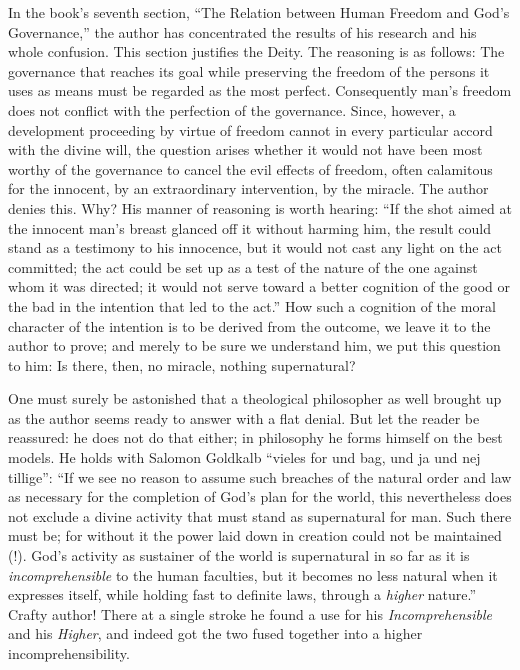 \documentclass[12pt,a4paper,openany]{book}
\newcommand{\opage}[1]{\marginnote{\footnotesize\textit{[#1]}}}
\begin{document}
In the book's seventh section, ``The Relation between Human Freedom and
God's Governance,'' the author has concentrated the results of his research
and his whole confusion. This section justifies the Deity. The reasoning is
as follows: The governance that reaches its goal while preserving the
freedom of the persons it uses as means must be regarded as the most
perfect. Consequently man's freedom does not conflict with the perfection
of the governance. Since, however, a development proceeding by virtue of
freedom cannot in every particular accord with the divine will, the
question arises whether it would not have been most worthy of the
governance to cancel the evil effects of freedom, often calamitous for the
innocent, by an extraordinary intervention, by the miracle. The author
denies this. Why?
\opage{25}His manner of reasoning is worth hearing: ``If the shot aimed at
the innocent man's breast glanced off it without harming him, the result
could stand as a testimony to his innocence, but it would not cast any
light on the act committed; the act could be set up as a test of the nature
of the one against whom it was directed; it would not serve toward a better
cognition of the good or the bad in the intention that led to the act.''
How such a cognition of the moral character of the intention is to be
derived from the outcome, we leave it to the author to prove; and merely to
be sure we understand him, we put this question to him: Is there,
then, no miracle, nothing supernatural?

One must surely be astonished that a theological philosopher as well
brought up as the author seems ready to answer with a flat denial. But let
the reader be reassured: he does not do that either; in philosophy he forms
himself on the best models. He holds with Salomon Goldkalb ``vieles for und
bag, und ja und nej tillige'': ``If we see no reason to assume such
breaches of the natural order and law as necessary for the completion of
God's plan for the world, this nevertheless does not exclude a divine
activity that must stand as supernatural for man. Such there must be; for
without it the power laid down in creation could not be maintained (!).
God's activity as sustainer of the world is supernatural in so far as it is
\emph{incomprehensible} to the human faculties, but it becomes no less
natural when it expresses itself, while holding fast to definite laws,
through a \emph{higher} nature.'' Crafty author! There at a single stroke
he found a use for his \emph{Incomprehensible} and his \emph{Higher}, and
indeed got the two fused together into a higher
incomprehensibility.
\end{document}
